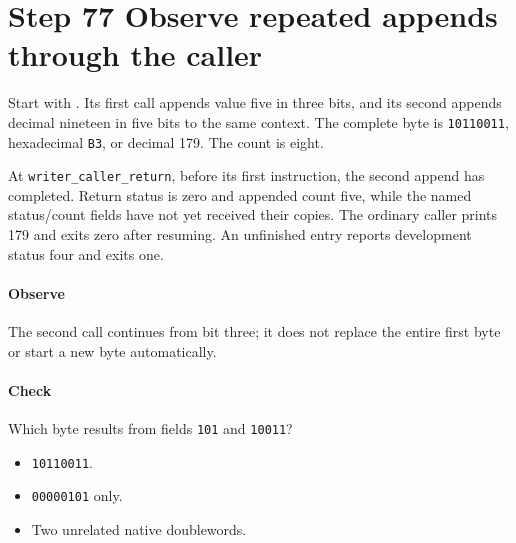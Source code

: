 \section{Step 77 Observe repeated appends through the caller}\label{h263-writer-s07}
Start with . Its first call
appends value five in three bits, and its second appends decimal nineteen in five
bits to the same context. The complete byte is \texttt{10110011}, hexadecimal
\texttt{B3}, or decimal 179. The count is eight.

At \texttt{writer\_caller\_return}, before its first instruction, the second
append has completed. Return status is zero and appended count five, while the
named status/count fields have not yet received their copies. The ordinary caller
prints 179 and exits zero after resuming. An unfinished entry reports development
status four and exits one.

\paragraph{Observe} The second call continues from bit three; it does not
replace the entire first byte or start a new byte automatically.
\paragraph{Check} Which byte results from fields \texttt{101} and \texttt{10011}?
\begin{itemize}
  \item[A.] \texttt{10110011}.
  \item[B.] \texttt{00000101} only.
  \item[C.] Two unrelated native doublewords.
\end{itemize}
